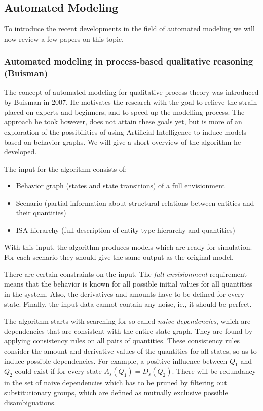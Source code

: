 \documentclass{article}
\begin{document}
\subsection{Automated Modeling}

To introduce the recent developments in the field of automated modeling we
will now review a few papers on this topic.

\subsubsection{Automated modeling in process-based qualitative reasoning
(Buisman)}
The concept of automated modeling for qualitative process theory was introduced
by Buisman \cite{buisman} in 2007. He motivates the research with the goal to
relieve the strain placed on experts and beginners, and to speed up the
modelling process. The approach he took however, does not attain these
goals yet, but is more of an exploration of the possibilities of using
Artificial Intelligence to induce models based on behavior graphs. We will give
a short overview of the algorithm he developed.

The input for the algorithm consists of:

\begin{itemize}

\item Behavior graph (states and state transitions) of a full envisionment

\item Scenario (partial information about structural relations between entities and their quantities)

\item ISA-hierarchy (full description of entity type hierarchy and quantities)

\end{itemize}

With this input, the algorithm produces models which are ready for simulation.
For each scenario they should give the same output as the original model.

There are certain constraints on the input. The \emph{full envisionment}
requirement means that the behavior is known for all possible initial values for
all quantities in the system. Also, the derivatives and amounts have to be
defined for every state. Finally, the input data cannot contain any noise, 
ie., it should be perfect.

The algorithm starts with searching for so called \emph{naive dependencies},
which are dependencies that are consistent with the entire state-graph. They are
found by applying consistency rules on all pairs of quantities. These
consistency rules consider the amount and derivative values of the quantities
for all states, so as to induce possible dependencies. For example, a positive
influence between $Q_1$ and $Q_2$ could exist if for every state $A_s(Q_1) =
D_s(Q_2)$.  There will be redundancy in the set of naive dependencies which has
to be pruned by filtering out substitutionary groups, which are defined as
mutually exclusive possible disambiguations. 
\end{document}
